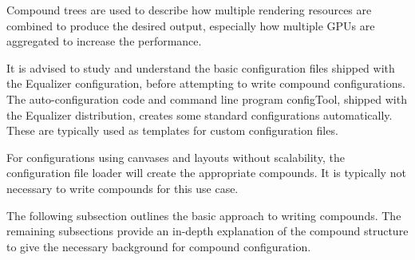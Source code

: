 \documentclass[10pt,a4]{scrartcl}
\begin{document}
Compound trees are used to describe how multiple rendering resources are
combined to produce the desired output, especially how multiple GPUs are
aggregated to increase the performance.

It is advised to study and understand the basic configuration files shipped with
the Equalizer configuration, before attempting to write compound
configurations. The auto-configuration code and command line program
\textsf{configTool}, shipped with the Equalizer distribution, creates some
standard configurations automatically. These are typically used as templates for
custom configuration files.

For configurations using canvases and layouts without scalability, the
configuration file loader will create the appropriate compounds. It is
typically not necessary to write compounds for this use case.

The following subsection outlines the basic approach to writing
compounds. The remaining subsections provide an in-depth explanation of
the compound structure to give the necessary background for compound
configuration.
\end{document}
